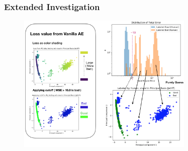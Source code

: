 \documentclass{beamer}
\begin{document}
\begin{frame}
\frametitle{Extended Investigation}
\begin{figure}
    \includegraphics[height=0.85\textheight, width=0.75\textwidth]{images/guess_visual}
\end{figure}
\end{frame}

\end{document}
